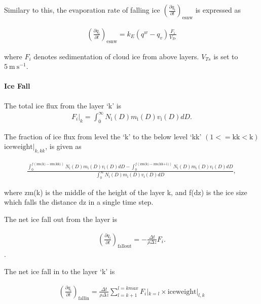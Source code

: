 Similary to this, the evaporation rate of falling ice
\(\left(\frac{\partial q_i}{\partial t}\right)_{\text {esnw}}\) is
expressed as

\begin{eqnarray}
\left(\frac{\partial q_i}{\partial t}\right)_{\text {esnw}}
=k_{E}\left(q^{w}-q_v\right) \frac{F_i}{V_{Tr}}
\end{eqnarray}

where \(F_i\) denotes sedimentation of cloud ice from above layers.
\(V_{Ts}\) is set to \(5\mathrm{~m} \mathrm{~s}^{-1}\).

\hypertarget{ice-fall}{%
\paragraph{Ice Fall}\label{ice-fall}}

The total ice flux from the layer `k' is \begin{eqnarray}
F_i|_k = \int^\infty_0 N_{\mathrm{i}}(D) m_{\mathrm{i}}(D) v_{\text {i}}(D)dD.
\end{eqnarray}

The fraction of ice flux from level the `k' to the below level `kk'
\((1<=\text{kk}<\text{k})\) \(\text{iceweight}|_{k,kk}\), is given as

\begin{eqnarray}
\frac{\int^{f(\text{zm(k)}-\text{zm(kk)})}_0 N_{\mathrm{i}}(D) m_{\mathrm{i}}(D) v_{\text {i}}(D)dD-
\int^{f(\text{zm(k)}-\text{zm(kk+1)})}_0 N_{\mathrm{i}}(D) m_{\mathrm{i}}(D) v_{\text {i}}(D)dD}
{\int^\infty_0 N_{\mathrm{i}}(D) m_{\mathrm{i}}(D) v_{\text {i}}(D)dD},
\end{eqnarray}

where zm(k) is the middle of the height of the layer k, and f(dz) is the
ice size which falls the distance dz in a single time step.

The net ice fall out from the layer is

\begin{eqnarray}
\left(\frac{\partial q_i}{\partial t}\right)_{\text {fallout}}
=-\frac{\Delta t}{\rho \Delta z}F_i.
\end{eqnarray}.

The net ice fall in to the layer `k' is

\begin{eqnarray}
\left(\frac{\partial q_i}{\partial t}\right)_{\text {fallin}}
=\frac{\Delta t}{\rho \Delta z} \sum^{l=kmax}_{l=k+1}F_i|_{k=l} \times \text{iceweight}|_{l,k}
\end{eqnarray}

